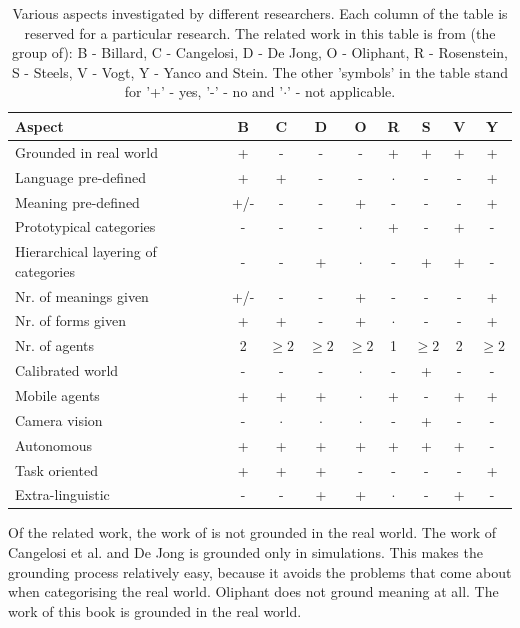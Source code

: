 \begin{table}[t]
\begin{tabular}{||p{3.5cm}|c|c|c|c|c|c|c|c||}
\hline\hline
Aspect & B & C & D & O & R & S & V & Y\\\hline
Grounded in real world & + & - & - & - & + & + & + & +\\\hline
Language pre-defined & + & + & - & - & $\cdot$ & - & - & +\\\hline
Meaning pre-defined & +/- & - & - & + & - & - & - & +\\\hline
Prototypical categories & - & - & - & $\cdot$ & + & - & + & -\\\hline
Hierarchical layering of categories & - & - & + & $\cdot$ & - & + & + & -\\\hline
Nr. of meanings given & +/- & - & - & + & - & - & - & +\\\hline
Nr. of forms given & + & + & - & + & $\cdot$ & - & - & +\\\hline
Nr. of agents & 2 & $\geq 2$ & $\geq 2$ & $\geq 2$ & 1 & $\geq 2$ & 2 & $\geq 2$\\\hline
Calibrated world & - & - & - & $\cdot$ & - & + & - & -\\\hline
Mobile agents & + & + & + & $\cdot$ & + & - & + & +\\\hline
Camera vision & - & $\cdot$ & $\cdot$ & $\cdot$ & - & + & - & -\\\hline
Autonomous & + & + & + & + & + & + & + & -\\\hline
Task oriented & + & + & + & - & - & - & - & +\\\hline
Extra-linguistic & - & - & + & + & $\cdot$ & - & + & -\\\hline
\hline
\end{tabular}
\caption{Various aspects investigated by different researchers. Each column of the table is reserved for a particular research. The related work in this table is from (the group of): B - Billard, C - Cangelosi, D - De Jong, O - Oliphant, R - Rosenstein, S - Steels, V - Vogt, Y - Yanco and Stein. The other 'symbols' in the table stand for '+' - yes, '-' - no and '$\cdot$' - not applicable.}
\label{t:intro:contrib}
\end{table}


Of the related work, the work of \citep{cangelosiparisi:1998,dejong:2000,oliphant:1997} is not grounded in the real world. The work of Cangelosi et al. and De Jong is grounded only in simulations. This makes the grounding process relatively easy, because it avoids the problems that come about when categorising the real world. Oliphant does not ground meaning at all. The work of this book is grounded in the real world.

